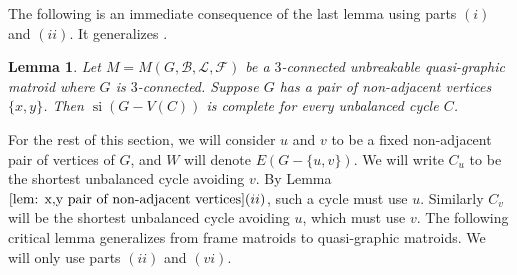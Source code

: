 \documentclass[12pt]{article}
\newtheorem{lemma}[theorem]{Lemma}
\theoremstyle{definition}
\theoremstyle{plain} %
\newcommand{\cB}{\mathcal{B}}
\newcommand{\cF}{\mathcal{F}}
\newcommand{\cL}{\mathcal{L}}
\DeclareMathOperator{\si}{si}
\newcommand{\qbg}{\ensuremath{(G,\cB,\cL,\cF)}}
\begin{document}
The following is an immediate consequence of the last lemma using parts $(i)$ and $(ii)$. It generalizes \cite[Lemma 4.3]{Fife-Mayhew-Oxley-Semple2020}.

\begin{lemma}\label{lem: delete a cycle}
    Let $M=M\qbg$ be a $3$-connected unbreakable quasi-graphic matroid where $G$ is $3$-connected. Suppose $G$ has a pair of non-adjacent vertices $\{x,y\}$. Then $\si(G-V(C))$ is complete for every unbalanced cycle $C$.
\end{lemma}




For the rest of this section, we will consider $u$ and $v$ to be a fixed non-adjacent pair of vertices of $G$, and $W$ will denote $E(G-\{u,v\})$. We will write $C_u$ to be the shortest unbalanced cycle avoiding $v$. By Lemma $\ref{lem: x,y pair of non-adjacent vertices}(ii)$, such a cycle must use $u$. Similarly $C_v$ will be the shortest unbalanced cycle avoiding $u$, which must use $v$. The following critical lemma generalizes \cite[Lemma 4.4]{Fife-Mayhew-Oxley-Semple2020} from frame matroids to quasi-graphic matroids. 
We will only use parts $(ii)$ and $(vi)$.
\end{document}

